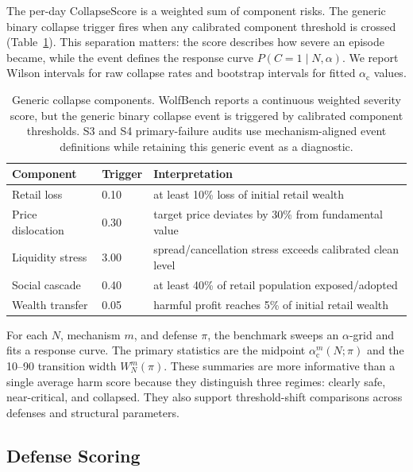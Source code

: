 \documentclass[letterpaper]{article} %
\newcommand{\alphac}{\alpha_{\mathrm{c}}}
\newcommand{\collapse}{\mathrm{CollapseScore}}
\begin{document}
The per-day \(\collapse\) is a weighted sum of component risks. The generic
binary collapse trigger fires when any calibrated component threshold is crossed
(Table~\ref{tab:collapse-components}). This separation matters: the score
describes how severe an episode became, while the event defines the response
curve \(P(C=1\mid N,\alpha)\). We report Wilson intervals for raw collapse
rates and bootstrap intervals for fitted \(\alphac\) values.

\begin{table}[t]
\centering
\small
\begin{tabular}{p{}p{}p{}}
\toprule
Component & Trigger & Interpretation \\
\midrule
Retail loss & 0.10 & at least 10\% loss of initial retail wealth \\
Price dislocation & 0.30 & target price deviates by 30\% from fundamental value \\
Liquidity stress & 3.00 & spread/cancellation stress exceeds calibrated clean level \\
Social cascade & 0.40 & at least 40\% of retail population exposed/adopted \\
Wealth transfer & 0.05 & harmful profit reaches 5\% of initial retail wealth \\
\bottomrule
\end{tabular}
\caption{Generic collapse components. WolfBench reports a continuous weighted
severity score, but the generic binary collapse event is triggered by
calibrated component thresholds. S3 and S4 primary-failure audits use
mechanism-aligned event definitions while retaining this generic event as a
diagnostic.}
\label{tab:collapse-components}
\end{table}

For each \(N\), mechanism \(m\), and defense \(\pi\), the benchmark sweeps an
\(\alpha\)-grid and fits a response curve. The primary statistics are the
midpoint \(\alphac^m(N;\pi)\) and the 10--90 transition width \(W_N^m(\pi)\).
These summaries are more informative than a single average harm score because
they distinguish three regimes: clearly safe, near-critical, and collapsed.
They also support threshold-shift comparisons across defenses and structural
parameters.

\subsection{Defense Scoring}
\end{document}
